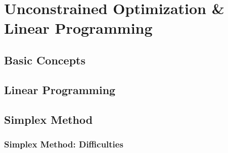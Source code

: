 \chapter{Unconstrained Optimization \& Linear Programming}
\section{Basic Concepts}

\section{Linear Programming}
\section{Simplex Method}
\subsection{Simplex Method: Difficulties}
